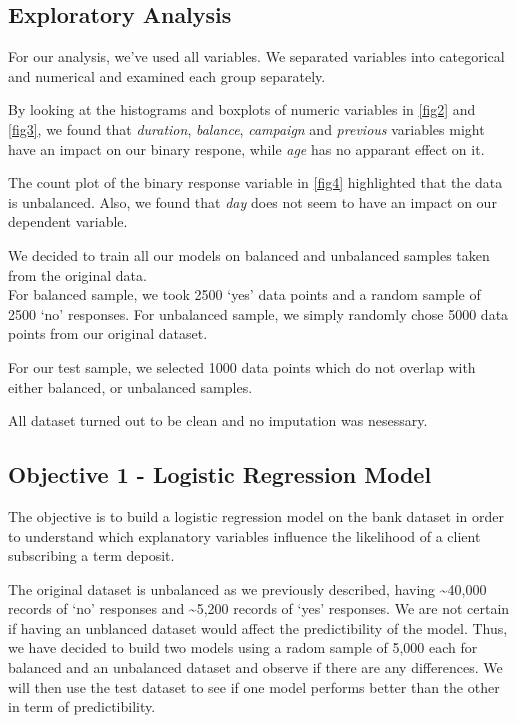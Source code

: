\documentclass[]{article}
\begin{document}
\subsection{Exploratory Analysis}\label{exploratory-analysis}

For our analysis, we've used all variables. We separated variables into
categorical and numerical and examined each group separately.

By looking at the histograms and boxplots of numeric variables in
\autoref{fig2} and \autoref{fig3}, we found that \emph{duration},
\emph{balance}, \emph{campaign} and \emph{previous} variables might have
an impact on our binary respone, while \emph{age} has no apparant effect
on it.

The count plot of the binary response variable in \autoref{fig4}
highlighted that the data is unbalanced. Also, we found that \emph{day}
does not seem to have an impact on our dependent variable.

We decided to train all our models on balanced and unbalanced samples
taken from the original data.\\
For balanced sample, we took 2500 `yes' data points and a random sample
of 2500 `no' responses. For unbalanced sample, we simply randomly chose
5000 data points from our original dataset.

For our test sample, we selected 1000 data points which do not overlap
with either balanced, or unbalanced samples.

All dataset turned out to be clean and no imputation was nesessary.

\subsection{Objective 1 - Logistic Regression
Model}\label{objective-1---logistic-regression-model}

The objective is to build a logistic regression model on the bank
dataset in order to understand which explanatory variables influence the
likelihood of a client subscribing a term deposit.

The original dataset is unbalanced as we previously described, having
\textasciitilde{}40,000 records of `no' responses and
\textasciitilde{}5,200 records of `yes' responses. We are not certain if
having an unblanced dataset would affect the predictibility of the
model. Thus, we have decided to build two models using a radom sample of
5,000 each for balanced and an unbalanced dataset and observe if there
are any differences. We will then use the test dataset to see if one
model performs better than the other in term of predictibility.
\end{document}
